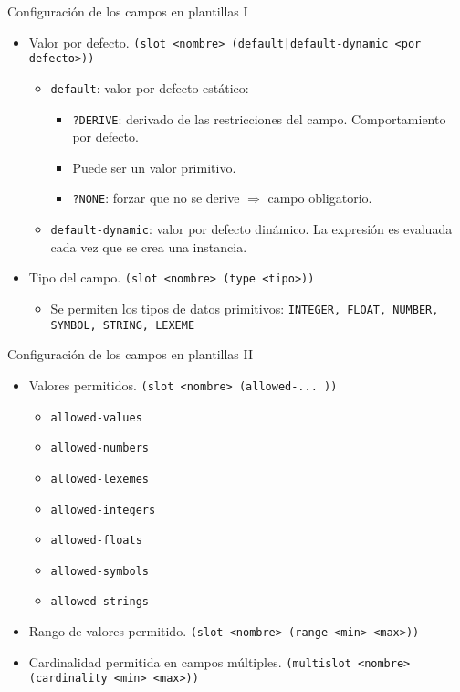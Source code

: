 \documentclass[usenames,dvipsnames,aspectratio=169]{beamer}
\begin{document}
\begin{frame}{Configuración de los campos en plantillas I}
	\begin{itemize}
		\item Valor por defecto. \texttt{(slot <nombre> (default|default-dynamic <por defecto>))}
		\begin{itemize}
			\item \texttt{default}: valor por defecto estático:
			\begin{itemize}
				\item \texttt{?DERIVE}: derivado de las restricciones del campo. Comportamiento por defecto.
				\item Puede ser un valor primitivo.
				\item \texttt{?NONE}: forzar que no se derive $\Rightarrow$ campo obligatorio.
			\end{itemize} 
			\item \texttt{default-dynamic}: valor por defecto dinámico. La expresión es evaluada cada vez que se crea una instancia.
		\end{itemize}
		\item Tipo del campo. \texttt{(slot <nombre> (type <tipo>))}
			\begin{itemize}
				\item Se permiten los tipos de datos primitivos: \texttt{INTEGER, FLOAT, NUMBER, SYMBOL, STRING, LEXEME}
			\end{itemize}
	\end{itemize}
\end{frame}

\begin{frame}{Configuración de los campos en plantillas II}
	\begin{itemize}
		\item Valores permitidos. \texttt{(slot <nombre> (allowed-... ))}
		\begin{minipage}{.4\textwidth}
			\begin{itemize}
				\item \texttt{allowed-values}
				\item \texttt{allowed-numbers}
				\item \texttt{allowed-lexemes}
			\end{itemize}
		\end{minipage}
		\begin{minipage}{.4\textwidth}
			\begin{itemize}\setlength\itemsep{1pt}
				\item \texttt{allowed-integers}
				\item \texttt{allowed-floats}
				\item \texttt{allowed-symbols}
				\item \texttt{allowed-strings}
			\end{itemize}
		\end{minipage}
		\item Rango de valores permitido. \texttt{(slot <nombre> (range <min> <max>))}
		\item Cardinalidad permitida en campos múltiples. \texttt{(multislot <nombre> (cardinality <min> <max>))}
	\end{itemize}
\end{frame}
\end{document}
